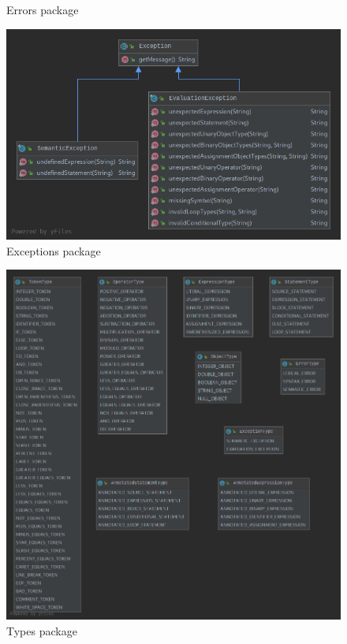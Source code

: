 \documentclass[
]{report}
\begin{document}
\begin{appendices}
\begin{figure}
		\caption{Errors package}
		\label{fig:errors-package-diagram}
	\end{figure}
	\begin{figure}
		\centering
		\includegraphics[width=\textwidth]{exceptions-package-diagram}
		\caption{Exceptions package}
		\label{fig:exceptions-package-diagram}
	\end{figure}
	\begin{figure}
		\centering
		\includegraphics[width=\textwidth]{types-package-diagram}
		\caption{Types package}
		\label{fig:types-package-diagram}

\end{figure}
\end{appendices}
\end{document}
